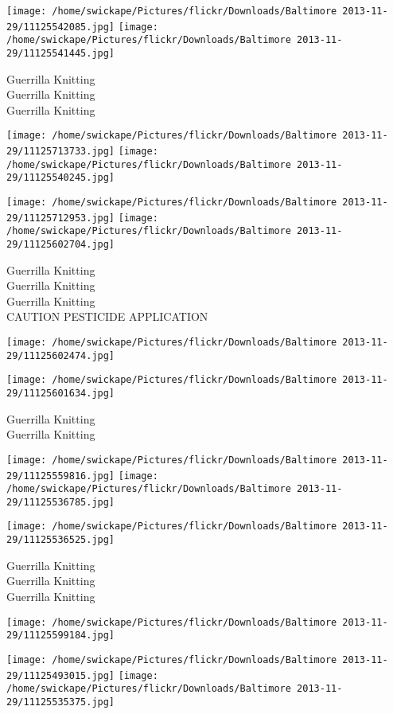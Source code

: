 \documentclass[10pt,letterpaper]{article}
\begin{document}
\vspace{0.25in}
\texttt{[image: /home/swickape/Pictures/flickr/Downloads/Baltimore 2013-11-29/11125542085.jpg]}
\texttt{[image: /home/swickape/Pictures/flickr/Downloads/Baltimore 2013-11-29/11125541445.jpg]}

Guerrilla Knitting\\
Guerrilla Knitting\\
Guerrilla Knitting
\pagebreak

\texttt{[image: /home/swickape/Pictures/flickr/Downloads/Baltimore 2013-11-29/11125713733.jpg]}
\texttt{[image: /home/swickape/Pictures/flickr/Downloads/Baltimore 2013-11-29/11125540245.jpg]}

\texttt{[image: /home/swickape/Pictures/flickr/Downloads/Baltimore 2013-11-29/11125712953.jpg]}
\texttt{[image: /home/swickape/Pictures/flickr/Downloads/Baltimore 2013-11-29/11125602704.jpg]}

Guerrilla Knitting\\
Guerrilla Knitting\\
Guerrilla Knitting\\
CAUTION PESTICIDE APPLICATION
\pagebreak

\texttt{[image: /home/swickape/Pictures/flickr/Downloads/Baltimore 2013-11-29/11125602474.jpg]}

\vspace{0.25in}
\texttt{[image: /home/swickape/Pictures/flickr/Downloads/Baltimore 2013-11-29/11125601634.jpg]}

Guerrilla Knitting\\
Guerrilla Knitting
\pagebreak

\texttt{[image: /home/swickape/Pictures/flickr/Downloads/Baltimore 2013-11-29/11125559816.jpg]}
\texttt{[image: /home/swickape/Pictures/flickr/Downloads/Baltimore 2013-11-29/11125536785.jpg]}

\texttt{[image: /home/swickape/Pictures/flickr/Downloads/Baltimore 2013-11-29/11125536525.jpg]}

Guerrilla Knitting\\
Guerrilla Knitting\\
Guerrilla Knitting
\pagebreak

\texttt{[image: /home/swickape/Pictures/flickr/Downloads/Baltimore 2013-11-29/11125599184.jpg]}

\vspace{0.25in}
\texttt{[image: /home/swickape/Pictures/flickr/Downloads/Baltimore 2013-11-29/11125493015.jpg]}
\texttt{[image: /home/swickape/Pictures/flickr/Downloads/Baltimore 2013-11-29/11125535375.jpg]}
\end{document}

